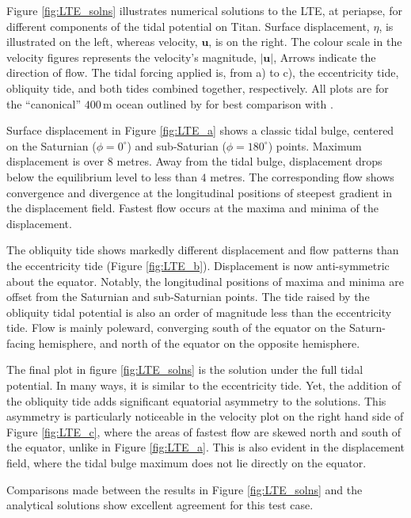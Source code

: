 Figure \ref{fig:LTE_solns} illustrates numerical solutions to the LTE, at periapse, for different components of the tidal potential on Titan. Surface displacement, $\eta$, is illustrated on the left, whereas velocity, $\bm{u}$, is on the right. The colour scale in the velocity figures represents the velocity's magnitude, $\left| \bm{u} \right|$, Arrows indicate the direction of flow. The tidal forcing applied is, from a) to c), the eccentricity tide, obliquity tide, and both tides combined together, respectively. All plots are for the ``canonical'' $400 \, \si{\metre}$ ocean outlined by \citet{sagan1982tide} for best comparison with \citet{sears1994tidal,sears1995tidal,sohl1995tidal}.

Surface displacement in Figure \ref{fig:LTE_a} shows a classic tidal bulge, centered on the Saturnian ($\phi = 0^{\circ}$) and sub-Saturian ($\phi = 180^{\circ}$) points. Maximum displacement is over $8$ metres. Away from the tidal bulge, displacement drops below the equilibrium level to less than $4$ metres. The corresponding flow shows convergence and divergence at the longitudinal positions of steepest gradient in the displacement field. Fastest flow occurs at the maxima and minima of the displacement.

The obliquity tide shows markedly different displacement and flow patterns than the eccentricity tide (Figure \ref{fig:LTE_b}). Displacement is now anti-symmetric about the equator. Notably, the longitudinal positions of maxima and minima are offset from the Saturnian and sub-Saturnian points. The tide raised by the obliquity tidal potential is also an order of magnitude less than the eccentricity tide. Flow is mainly poleward, converging south of the equator on the Saturn-facing hemisphere, and north of the equator on the opposite hemisphere.

The final plot in figure \ref{fig:LTE_solns} is the solution under the full tidal potential. In many ways, it is similar to the eccentricity tide. Yet, the addition of the obliquity tide adds significant equatorial asymmetry to the solutions. This asymmetry is particularly noticeable in the velocity plot on the right hand side of Figure \ref{fig:LTE_c}, where the areas of fastest flow are skewed north and south of the equator, unlike in Figure \ref{fig:LTE_a}. This is also evident in the displacement field, where the tidal bulge maximum does not lie directly on the equator.

Comparisons made between the results in Figure \ref{fig:LTE_solns} and the analytical solutions show excellent agreement for this test case.

